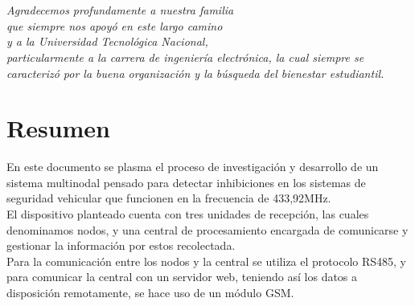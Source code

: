 \documentclass[12pt]{report}
\begin{document}

\chapter*{}
\begin{flushright}
\textit{Agradecemos profundamente a nuestra familia \\
que siempre nos apoyó en este largo camino \\
y a la Universidad Tecnológica Nacional, \\
particularmente a la carrera de ingeniería electrónica,
la cual siempre se caracterizó por la buena organización y la búsqueda del bienestar estudiantil.}
\end{flushright}

\chapter*{Resumen} %

En este documento se plasma el proceso de investigación y desarrollo de un sistema multinodal pensado para detectar 
inhibiciones en los sistemas de seguridad vehicular que funcionen en la frecuencia de 433,92MHz.\\
El dispositivo planteado cuenta con tres unidades de recepción, las cuales denominamos nodos, y una central de procesamiento
encargada de comunicarse y gestionar la información por estos recolectada. \\
Para la comunicación entre los nodos y la central se utiliza el protocolo RS485, 
y para comunicar la central con un servidor web, teniendo así los datos a disposición remotamente, se hace uso de un módulo GSM.


\tableofcontents %

\cleardoublepage
\listoffigures %

\cleardoublepage
\listoftables %

\end{document}
